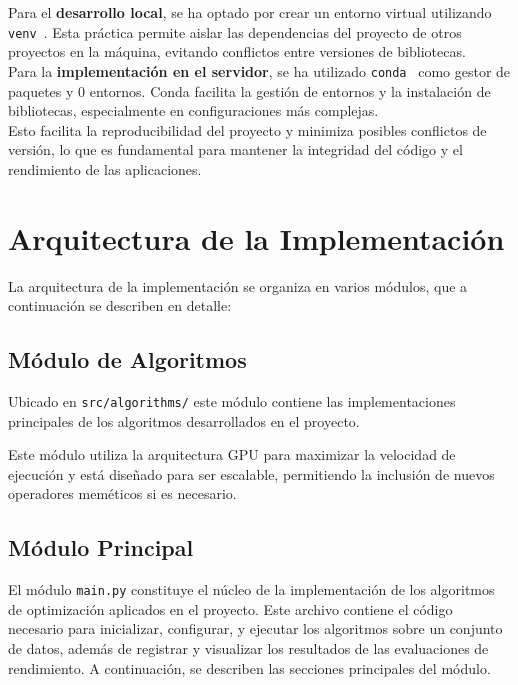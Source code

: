 Para el \textbf{desarrollo local}, se ha optado por crear un entorno virtual utilizando \texttt{venv}~\cite{venv}.
Esta práctica permite aislar las dependencias del proyecto de otros proyectos en la máquina, evitando conflictos entre
versiones de bibliotecas. \\[6pt]

Para la \textbf{implementación en el servidor}, se ha utilizado \texttt{conda}~\cite{conda} como gestor de paquetes y 0
entornos.
Conda facilita la gestión de entornos y la instalación de bibliotecas, especialmente en configuraciones más complejas.
\\[6pt]

Esto facilita la reproducibilidad del proyecto y minimiza posibles conflictos de versión, lo que es fundamental para
mantener la integridad del código y el rendimiento de las aplicaciones.

\section{Arquitectura de la Implementación}\label{sec:arquitectura-de-la-implementacion}
La arquitectura de la implementación se organiza en varios módulos, que a continuación se describen en detalle:

\subsection{Módulo de Algoritmos}\label{subsec:modulo-de-algoritmos}
Ubicado en \texttt{src/algorithms/} este módulo contiene las implementaciones principales de los
algoritmos desarrollados en el proyecto.

Este módulo utiliza la arquitectura GPU para maximizar la velocidad de ejecución y está diseñado para ser escalable,
permitiendo la inclusión de nuevos operadores meméticos si es necesario.

\subsection{Módulo Principal}\label{subsec:modulo-principal}
El módulo \texttt{main.py} constituye el núcleo de la implementación de los algoritmos de optimización aplicados en el
proyecto.
Este archivo contiene el código necesario para inicializar, configurar, y ejecutar los algoritmos sobre un conjunto de
datos, además de registrar y visualizar los resultados de las evaluaciones de rendimiento.
A continuación, se describen las secciones principales del módulo. \\[6pt]

